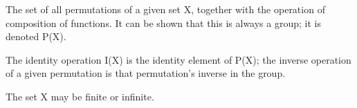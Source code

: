 The set of all permutations of a given set X, together with the
operation of composition of functions. It can be shown that this 
is always a group; it is denoted P(X).
\par
The identity operation I(X) is the identity element of P(X);
the inverse operation of a given permutation is that
permutation's inverse in the group.
\par
The set X may be finite or infinite.